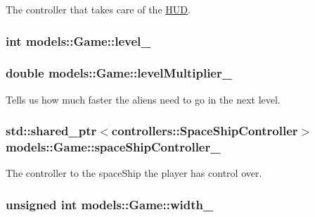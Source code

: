 \-The controller that takes care of the \hyperlink{classmodels_1_1HUD}{\-H\-U\-D}. 

\hypertarget{classmodels_1_1Game_a874b7370f21b44afa1e4aa30cfa84e1a}{
\subsubsection[{level\-\_\-}]{\setlength{\rightskip}{0pt plus 5cm}int {\bf models\-::\-Game\-::level\-\_\-}}}\label{d1/d10/classmodels_1_1Game_a874b7370f21b44afa1e4aa30cfa84e1a}
\hypertarget{classmodels_1_1Game_a7d27674020645d1e5e2babfcf09cd6af}{
\subsubsection[{level\-Multiplier\-\_\-}]{\setlength{\rightskip}{0pt plus 5cm}double {\bf models\-::\-Game\-::level\-Multiplier\-\_\-}}}\label{d1/d10/classmodels_1_1Game_a7d27674020645d1e5e2babfcf09cd6af}


\-Tells us how much faster the aliens need to go in the next level. 

\hypertarget{classmodels_1_1Game_a73891e3039540572f4117da47cb20723}{
\subsubsection[{space\-Ship\-Controller\-\_\-}]{\setlength{\rightskip}{0pt plus 5cm}std\-::shared\-\_\-ptr$<${\bf controllers\-::\-Space\-Ship\-Controller}$>$ {\bf models\-::\-Game\-::space\-Ship\-Controller\-\_\-}}}\label{d1/d10/classmodels_1_1Game_a73891e3039540572f4117da47cb20723}


\-The controller to the space\-Ship the player has control over. 

\hypertarget{classmodels_1_1Game_a2d35c6907ba8c23ff04437ed5ba43600}{
\subsubsection[{width\-\_\-}]{\setlength{\rightskip}{0pt plus 5cm}unsigned int {\bf models\-::\-Game\-::width\-\_\-}}}\label{d1/d10/classmodels_1_1Game_a2d35c6907ba8c23ff04437ed5ba43600}


